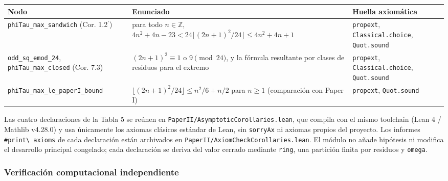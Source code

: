 \documentclass[spanish,11pt,a4paper]{article}
\newcounter{none}
\begin{document}
{\def\LTcaptype{none} %
\begin{longtable}[]{@{}
  >{\raggedright\arraybackslash}p{}
  >{\raggedright\arraybackslash}p{}
  >{\raggedright\arraybackslash}p{}@{}}
\toprule\noalign{}
\begin{minipage}[b]{\linewidth}\raggedright
Nodo
\end{minipage} & \begin{minipage}[b]{\linewidth}\raggedright
Enunciado
\end{minipage} & \begin{minipage}[b]{\linewidth}\raggedright
Huella axiomática
\end{minipage} \\
\midrule\noalign{}
\endhead
\bottomrule\noalign{}
\endlastfoot
\nolinkurl{phiTau_max_sandwich} (Cor. 1.2\(^{\prime}\)) & para todo
\(n\in\mathbb Z\),
\(4n^2+4n-23<24\lfloor(2n+1)^2/24\rfloor\le4n^2+4n+1\) &
\nolinkurl{propext}, \nolinkurl{Classical.choice}, \nolinkurl{Quot.sound} \\
\nolinkurl{odd_sq_emod_24}, \nolinkurl{phiTau_max_closed} (Cor. 7.3) &
\((2n+1)^2\equiv1\) o \(9\pmod{24}\), y la fórmula resultante por clases
de residuos para el extremo & \nolinkurl{propext},
\nolinkurl{Classical.choice}, \nolinkurl{Quot.sound} \\
\nolinkurl{phiTau_max_le_paperI_bound} &
\(\lfloor(2n+1)^2/24\rfloor\le n^2/6+n/2\) para \(n\ge1\) (comparación
con Paper I) & \nolinkurl{propext}, \nolinkurl{Quot.sound} \\
\end{longtable}
}

Las cuatro declaraciones de la Tabla 5 se reúnen en
\nolinkurl{PaperII/AsymptoticCorollaries.lean}, que compila con el mismo
toolchain (Lean 4 / Mathlib v4.28.0) y usa únicamente los axiomas
clásicos estándar de Lean, sin \nolinkurl{sorryAx} ni axiomas propios del
proyecto. Los informes \nolinkurl{#print\ axioms} de cada declaración
están archivados en \nolinkurl{PaperII/AxiomCheckCorollaries.lean}. El
módulo no añade hipótesis ni modifica el desarrollo principal congelado;
cada declaración se deriva del valor cerrado mediante \nolinkurl{ring}, una
partición finita por residuos y \nolinkurl{omega}.

\subsubsection{Verificación computacional
independiente}\label{verificaciuxf3n-computacional-independiente}
\end{document}
